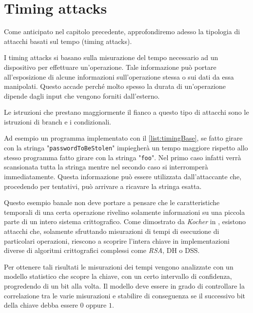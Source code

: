 \chapter{Timing attacks}
Come anticipato nel capitolo precedente, approfondiremo adesso la tipologia di attacchi basati sul tempo (timing attacks). 

I timing attacks si basano sulla misurazione del tempo necessario ad un dispositivo per effettuare un'operazione. Tale informazione può portare all'esposizione di alcune informazioni sull'operazione stessa o sui dati da essa manipolati. Questo accade perché molto spesso la durata di un'operazione dipende dagli input che vengono forniti dall'esterno.

Le istruzioni che prestano maggiormente il fianco a questo tipo di attacchi sono le istruzioni di branch e i condizionali.

\begin{center}
	
\end{center}

Ad esempio un programma implementato con il \cref{list:timingBase}, se fatto girare con la stringa "\texttt{passwordToBeStolen}" impiegherà un tempo maggiore rispetto allo stesso programma fatto girare con la stringa "\texttt{foo}". Nel primo caso infatti verrà scansionata tutta la stringa mentre nel secondo caso si interromperà immediatamente. Questa informazione può essere utilizzata dall'attaccante che, procedendo per tentativi, può arrivare a ricavare la stringa esatta.

Questo esempio banale non deve portare a pensare che le caratteristiche temporali di una certa operazione rivelino solamente informazioni su una piccola parte di un intero sistema crittografico. Come dimostrato da \emph{Kocher} in \cite{kocher1996timing}, esistono attacchi che, solamente sfruttando misurazioni di tempi di esecuzione di particolari operazioni, riescono a scoprire l'intera chiave in implementazioni diverse di algoritmi crittografici complessi come \emph{RSA}, \ac{DH} o \ac{DSS}.

Per ottenere tali risultati le misurazioni dei tempi vengono analizzate con un modello statistico che scopre la chiave, con un certo intervallo di confidenza, progredendo di un bit alla volta. Il modello deve essere in grado di controllare la correlazione tra le varie misurazioni e stabilire di conseguenza se il successivo bit della chiave debba essere $0$ oppure $1$.

